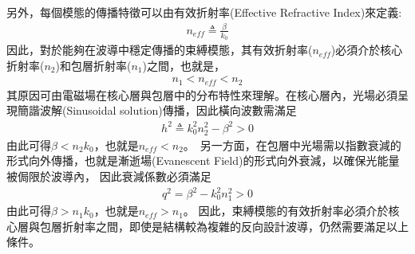 另外，每個模態的傳播特徵可以由有效折射率(Effective Refractive Index)來定義:
\begin{align}
n_{eff} \triangleq \frac{\beta}{k_0} 
\label{eq:effective refractive index}
\end{align}
因此，對於能夠在波導中穩定傳播的束縛模態，其有效折射率($n_{eff}$)必須介於核心折射率($n_2$)和包層折射率($n_1$)之間，也就是，
\begin{align}
n_{1} < n_{eff} < n_{2}
\label{eq:effective refractive index range}
\end{align}
其原因可由電磁場在核心層與包層中的分布特性來理解。在核心層內，光場必須呈現簡諧波解(Sinusoidal solution)傳播，因此橫向波數需滿足
\begin{align}
h^2\triangleq k_0^2 n_2^2 - \beta^2 > 0
\label{eq:Sinusoidal solution}
\end{align}
由此可得$\beta < n_2 k_0$，也就是$n_{eff} < n_2$。\
另一方面，在包層中光場需以指數衰減的形式向外傳播，也就是漸逝場(Evanescent Field)的形式向外衰減，以確保光能量被侷限於波導內，
因此衰減係數必須滿足
\begin{align}
q^2 = \beta^2 - k_0^2 n_1^2 > 0
\label{eq:Evanescent Field solution}
\end{align}
由此可得$\beta > n_1 k_0$，也就是$n_{eff} > n_1$。
因此，束縛模態的有效折射率必須介於核心層與包層折射率之間，即使是結構較為複雜的反向設計波導，仍然需要滿足以上條件。\

